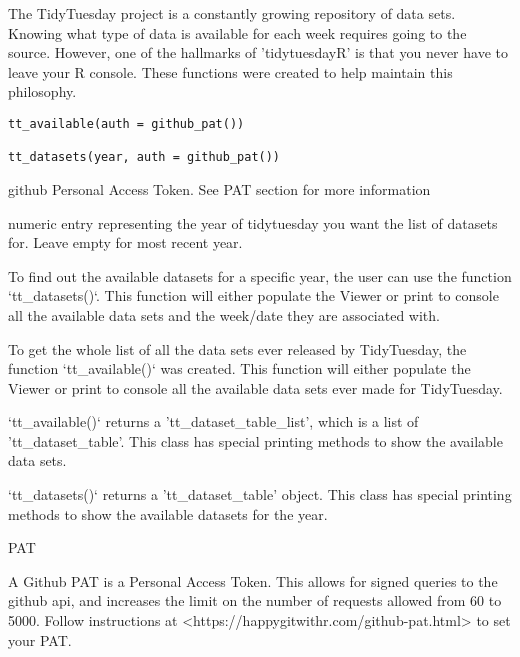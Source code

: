 \documentclass[letterpaper]{book}
\begin{document}
%
\begin{Description}\relax
The TidyTuesday project is a constantly growing repository of data sets.
Knowing what type of data is available for each week requires going to the
source. However, one of the hallmarks of 'tidytuesdayR' is that you never
have to leave your R console. These functions were
created to help maintain this philosophy.
\end{Description}
%
\begin{Usage}
\begin{verbatim}
tt_available(auth = github_pat())

tt_datasets(year, auth = github_pat())
\end{verbatim}
\end{Usage}
%
\begin{Arguments}
\begin{ldescription}
\item[\code{auth}] github Personal Access Token. See PAT section for
more information

\item[\code{year}] numeric entry representing the year of tidytuesday you want the
list of datasets for. Leave empty for most recent year.
\end{ldescription}
\end{Arguments}
%
\begin{Details}\relax
To find out the available datasets for a specific year, the user
can use the function `tt\_datasets()`. This function will either populate the
Viewer or print to console all the available data sets and the week/date
they are associated with.

To get the whole list of all the data sets ever released by TidyTuesday, the
function `tt\_available()` was created. This function will either populate the
Viewer or print to console all the available data sets ever made for
TidyTuesday.
\end{Details}
%
\begin{Value}
`tt\_available()` returns a 'tt\_dataset\_table\_list', which is a
list of 'tt\_dataset\_table'. This class has special printing methods to show
the available data sets.

`tt\_datasets()` returns a 'tt\_dataset\_table' object. This class has
special printing methods to show the available datasets for the year.
\end{Value}
%
\begin{Section}{PAT}


A Github PAT is a Personal Access Token. This allows for signed queries to
the github api, and increases the limit on the number of requests allowed
from 60 to 5000. Follow instructions at
<https://happygitwithr.com/github-pat.html> to set your PAT.
\end{Section}
\end{document}
